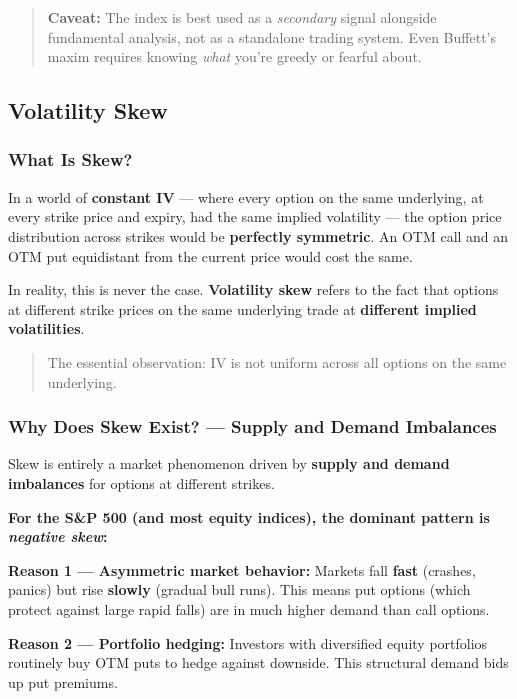 \documentclass[12pt,openany]{book}
\begin{document}
\begin{quote}
\textbf{Caveat:} The index is best used as a \emph{secondary} signal alongside fundamental analysis, not as a standalone trading system. Even Buffett's maxim requires knowing \emph{what} you're greedy or fearful about.
\end{quote}

\subsection{Volatility Skew}

\subsubsection{What Is Skew?}

In a world of \textbf{constant IV} — where every option on the same underlying, at every strike price and expiry, had the same implied volatility — the option price distribution across strikes would be \textbf{perfectly symmetric}. An OTM call and an OTM put equidistant from the current price would cost the same.

In reality, this is never the case. \textbf{Volatility skew} refers to the fact that options at different strike prices on the same underlying trade at \textbf{different implied volatilities}.

\begin{quote}
The essential observation: IV is not uniform across all options on the same underlying.
\end{quote}

\subsubsection{Why Does Skew Exist? — Supply and Demand Imbalances}

Skew is entirely a market phenomenon driven by \textbf{supply and demand imbalances} for options at different strikes.

\textbf{For the S\&P 500 (and most equity indices), the dominant pattern is \emph{negative skew}:}

\textbf{Reason 1 — Asymmetric market behavior:}
Markets fall \textbf{fast} (crashes, panics) but rise \textbf{slowly} (gradual bull runs). This means put options (which protect against large rapid falls) are in much higher demand than call options.

\textbf{Reason 2 — Portfolio hedging:}
Investors with diversified equity portfolios routinely buy OTM puts to hedge against downside. This structural demand bids up put premiums.
\end{document}
